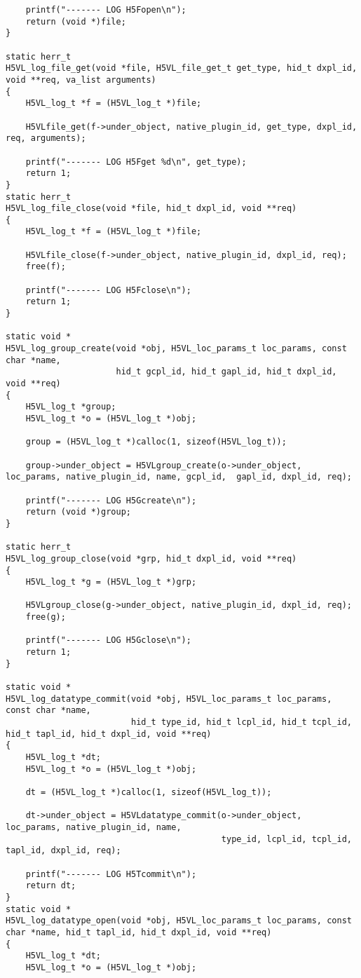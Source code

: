 \begin{appendices}
\begin{lstlisting}
    printf("------- LOG H5Fopen\n");
    return (void *)file;
}

static herr_t 
H5VL_log_file_get(void *file, H5VL_file_get_t get_type, hid_t dxpl_id, void **req, va_list arguments)
{
    H5VL_log_t *f = (H5VL_log_t *)file;

    H5VLfile_get(f->under_object, native_plugin_id, get_type, dxpl_id, req, arguments);

    printf("------- LOG H5Fget %d\n", get_type);
    return 1;
}
static herr_t 
H5VL_log_file_close(void *file, hid_t dxpl_id, void **req)
{
    H5VL_log_t *f = (H5VL_log_t *)file;

    H5VLfile_close(f->under_object, native_plugin_id, dxpl_id, req);
    free(f);

    printf("------- LOG H5Fclose\n");
    return 1;
}

static void *
H5VL_log_group_create(void *obj, H5VL_loc_params_t loc_params, const char *name, 
                      hid_t gcpl_id, hid_t gapl_id, hid_t dxpl_id, void **req)
{
    H5VL_log_t *group;
    H5VL_log_t *o = (H5VL_log_t *)obj;

    group = (H5VL_log_t *)calloc(1, sizeof(H5VL_log_t));

    group->under_object = H5VLgroup_create(o->under_object, loc_params, native_plugin_id, name, gcpl_id,  gapl_id, dxpl_id, req);

    printf("------- LOG H5Gcreate\n");
    return (void *)group;
}

static herr_t 
H5VL_log_group_close(void *grp, hid_t dxpl_id, void **req)
{
    H5VL_log_t *g = (H5VL_log_t *)grp;

    H5VLgroup_close(g->under_object, native_plugin_id, dxpl_id, req);
    free(g);

    printf("------- LOG H5Gclose\n");
    return 1;
}

static void *
H5VL_log_datatype_commit(void *obj, H5VL_loc_params_t loc_params, const char *name, 
                         hid_t type_id, hid_t lcpl_id, hid_t tcpl_id, hid_t tapl_id, hid_t dxpl_id, void **req)
{
    H5VL_log_t *dt;
    H5VL_log_t *o = (H5VL_log_t *)obj;

    dt = (H5VL_log_t *)calloc(1, sizeof(H5VL_log_t));

    dt->under_object = H5VLdatatype_commit(o->under_object, loc_params, native_plugin_id, name, 
                                           type_id, lcpl_id, tcpl_id, tapl_id, dxpl_id, req);

    printf("------- LOG H5Tcommit\n");
    return dt;
}
static void *
H5VL_log_datatype_open(void *obj, H5VL_loc_params_t loc_params, const char *name, hid_t tapl_id, hid_t dxpl_id, void **req)
{
    H5VL_log_t *dt;
    H5VL_log_t *o = (H5VL_log_t *)obj;  


\end{lstlisting}
\end{appendices}
